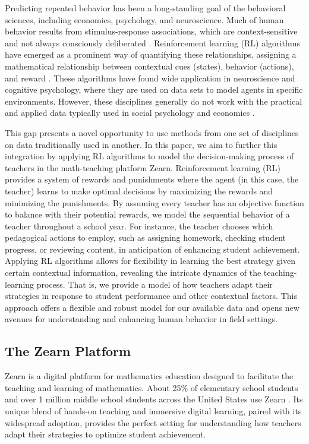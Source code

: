 \documentclass[
  number,
  preprint,
  3p,
  onecolumn]{elsarticle}
\begin{document}
Predicting repeated behavior has been a long-standing goal of the
behavioral sciences, including economics, psychology, and neuroscience.
Much of human behavior results from stimulus-response associations,
which are context-sensitive and not always consciously deliberated
\citep{buyalskaya2023}. Reinforcement learning (RL) algorithms have
emerged as a prominent way of quantifying these relationships, assigning
a mathematical relationship between contextual cues (states), behavior
(actions), and reward \citep{sutton2018}. These algorithms have found
wide application in neuroscience and cognitive psychology, where they
are used on data sets to model agents in specific environments. However,
these disciplines generally do not work with the practical and applied
data typically used in social psychology and economics
\citep{buyalskaya2023}.

This gap presents a novel opportunity to use methods from one set of
disciplines on data traditionally used in another. In this paper, we aim
to further this integration by applying RL algorithms to model the
decision-making process of teachers in the math-teaching platform Zearn.
Reinforcement learning (RL) provides a system of rewards and punishments
where the agent (in this case, the teacher) learns to make optimal
decisions by maximizing the rewards and minimizing the punishments. By
assuming every teacher has an objective function to balance with their
potential rewards, we model the sequential behavior of a teacher
throughout a school year. For instance, the teacher chooses which
pedagogical actions to employ, such as assigning homework, checking
student progress, or reviewing content, in anticipation of enhancing
student achievement. Applying RL algorithms allows for flexibility in
learning the best strategy given certain contextual information,
revealing the intricate dynamics of the teaching-learning process. That
is, we provide a model of how teachers adapt their strategies in
response to student performance and other contextual factors. This
approach offers a flexible and robust model for our available data and
opens new avenues for understanding and enhancing human behavior in
field settings.

\subsection{The Zearn Platform}\label{the-zearn-platform}

Zearn is a digital platform for mathematics education designed to
facilitate the teaching and learning of mathematics. About 25\% of
elementary school students and over 1 million middle school students
across the United States use Zearn \citep{post-weblog}. Its unique blend
of hands-on teaching and immersive digital learning, paired with its
widespread adoption, provides the perfect setting for understanding how
teachers adapt their strategies to optimize student achievement.
\end{document}
